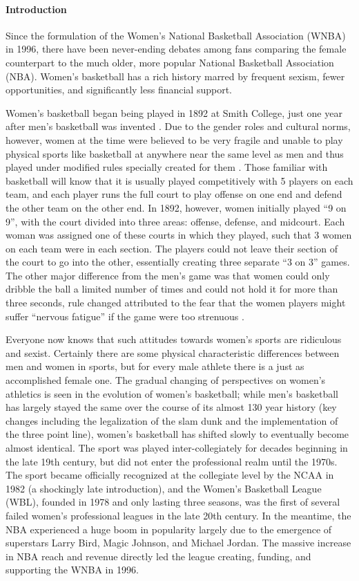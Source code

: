 \documentclass[12pt]{article}
\begin{document}
\paragraph{Introduction}
Since the formulation of the Women’s National Basketball Association (WNBA) in 1996, there have been never-ending debates among fans comparing the female counterpart to the much older, more popular National Basketball Association (NBA). Women’s basketball has a rich history marred by frequent sexism, fewer opportunities, and significantly less financial support.
\par
Women’s basketball began being played in 1892 at Smith College, just one year after men’s basketball was invented \cite{Shattering_The_Glass}. Due to the gender roles and cultural norms, however, women at the time were believed to be very fragile and unable to play physical sports like basketball at anywhere near the same level as men and thus played under modified rules specially created for them \cite{WNBA_Hist}. Those familiar with basketball will know that it is usually played competitively with 5 players on each team, and each player runs the full court to play offense on one end and defend the other team on the other end. In 1892, however, women initially played “9 on 9”, with the court divided into three areas: offense, defense, and midcourt. Each woman was assigned one of these courts in which they played, such that 3 women on each team were in each section. The players could not leave their section of the court to go into the other, essentially creating three separate “3 on 3” games. The other major difference from the men’s game was that women could only dribble the ball a limited number of times and could not hold it for more than three seconds, rule changed attributed to the fear that the women players might suffer “nervous fatigue” if the game were too strenuous \cite{WNBA_Hist}.
\par
Everyone now knows that such attitudes towards women’s sports are ridiculous and sexist. Certainly there are some physical characteristic differences between men and women in sports, but for every male athlete there is a just as accomplished female one. The gradual changing of perspectives on women’s athletics is seen in the evolution of women’s basketball; while men’s basketball has largely stayed the same over the course of its almost 130 year history (key changes including the legalization of the slam dunk and the implementation of the three point line), women’s basketball has shifted slowly to eventually become almost identical. The sport was played inter-collegiately for decades beginning in the late 19th century, but did not enter the professional realm until the 1970s. The sport became officially recognized at the collegiate level by the NCAA in 1982 (a shockingly late introduction), and the Women’s Basketball League (WBL), founded in 1978 and only lasting three seasons, was the first of several failed women’s professional leagues in the late 20th century. In the meantime, the NBA experienced a huge boom in popularity largely due to the emergence of superstars Larry Bird, Magic Johnson, and Michael Jordan. The massive increase in NBA reach and revenue directly led the league creating, funding, and supporting the WNBA in 1996.
\end{document}
